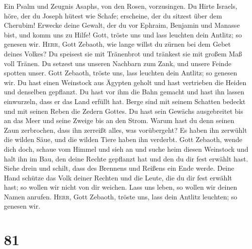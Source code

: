  Ein Psalm und Zeugnis Asaphs, von den Rosen, vorzusingen.
 Du Hirte Israels, höre, der du Joseph hütest wie Schafe;
erscheine, der du sitzest über dem Cherubim!  Erwecke
deine Gewalt, der du vor Ephraim, Benjamin und Manasse bist, und komm
uns zu Hilfe!  Gott, tröste uns und lass leuchten dein
Antlitz; so genesen wir.  \textsc{Herr}, Gott Zebaoth, wie
lange willst du zürnen bei dem Gebet deines Volkes?  Du
speisest sie mit Tränenbrot und tränkest sie mit großem Maß voll Tränen.
 Du setzest uns unseren Nachbarn zum Zank, und unsere
Feinde spotten unser.  Gott Zebaoth, tröste uns, lass
leuchten dein Antlitz; so genesen wir.  Du hast einen
Weinstock aus Ägypten geholt und hast vertrieben die Heiden und
denselben gepflanzt.  Du hast vor ihm die Bahn gemacht
und hast ihn lassen einwurzeln, dass er das Land erfüllt hat.
 Berge sind mit seinem Schatten bedeckt und mit seinen
Reben die Zedern Gottes.  Du hast sein Gewächs
ausgebreitet bis an das Meer und seine Zweige bis an den Strom.
 Warum hast du denn seinen Zaun zerbrochen, dass ihn
zerreißt alles, was vorübergeht?  Es haben ihn zerwühlt
die wilden Säue, und die wilden Tiere haben ihn verderbt.
 Gott Zebaoth, wende dich doch, schaue vom Himmel und
sieh an und suche heim diesen Weinstock  und halt ihn im
Bau, den deine Rechte gepflanzt hat und den du dir fest erwählt hast.
 Siehe drein und schilt, dass des Brennens und Reißens
ein Ende werde.  Deine Hand schütze das Volk deiner
Rechten und die Leute, die du dir fest erwählt hast;  so
wollen wir nicht von dir weichen. Lass uns leben, so wollen wir deinen
Namen anrufen.  \textsc{Herr}, Gott Zebaoth, tröste uns,
lass dein Antlitz leuchten; so genesen wir.

\hypertarget{section-80}{%
\section{81}\label{section-80}}

